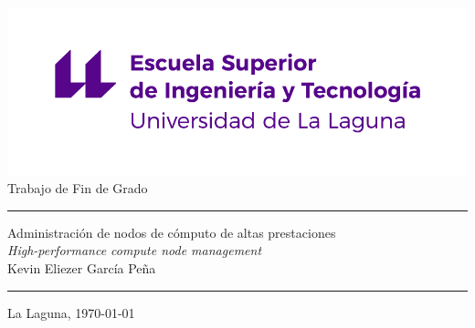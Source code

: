 \documentclass[spanish,a4paper,12pt,oneside]{extreport}
\begin{document}
\renewcommand\listtablename{Índice de Tablas}    
\renewcommand\listfigurename{Índice de Figuras}    

\renewcommand{\lstlistingname}{Listado}
\renewcommand{\lstlistlistingname}{Índice de \lstlistingname s}%

\pagestyle{empty}
\thispagestyle{empty}


\newcommand{\HRule}{\rule{\linewidth}{1mm}}
\setlength{\parindent}{0mm}
\setlength{\parskip}{0mm}


\begin{center}
\includegraphics[scale=0.8]{images/escuela-ingenieria-tecnologia-original}\\[10mm]
{\Huge Trabajo de Fin de Grado}
\end{center}

\HRule
\begin{flushright}
        {\Huge Administración de nodos de cómputo de altas prestaciones} \\[2.5mm]
        {\Large \textit{High-performance compute node management}} \\[5mm]
        {\Large Kevin Eliezer García Peña} \\[5mm]


\end{flushright}
\HRule
{}
\begin{center}
  \Large La Laguna, \today
\end{center}

\setlength{\parindent}{5mm}

\newpage
\thispagestyle{empty}
\end{document}
